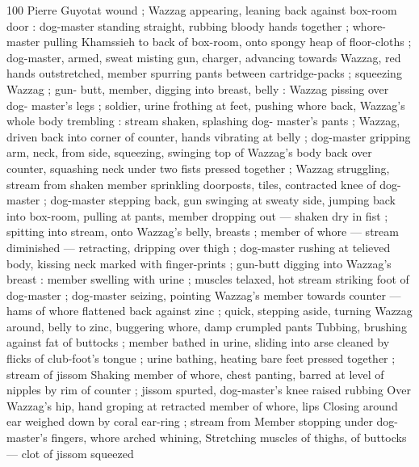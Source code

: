 100 Pierre Guyotat
wound ; Wazzag appearing, leaning back against box-room door :
dog-master standing straight, rubbing bloody hands together ;
whore-master pulling Khamssieh to back of box-room, onto spongy
heap of floor-cloths ; dog-master, armed, sweat misting gun, charger,
advancing towards Wazzag, red hands outstretched, member
spurring pants between cartridge-packs ; squeezing Wazzag ; gun-
butt, member, digging into breast, belly : Wazzag pissing over dog-
master's legs ; soldier, urine frothing at feet, pushing whore back,
Wazzag's whole body trembling : stream shaken, splashing dog-
master's pants ; Wazzag, driven back into corner of counter, hands
vibrating at belly ; dog-master gripping arm, neck, from side,
squeezing, swinging top of Wazzag's body back over counter,
squashing neck under two fists pressed together ; Wazzag
struggling, stream from shaken member sprinkling doorposts, tiles,
contracted knee of dog-master ; dog-master stepping back, gun
swinging at sweaty side, jumping back into box-room, pulling at
pants, member dropping out — shaken dry in fist ; spitting into
stream, onto Wazzag's belly, breasts ; member of whore — stream
diminished — retracting, dripping over thigh ; dog-master rushing at
telieved body, kissing neck marked with finger-prints ; gun-butt
digging into Wazzag's breast : member swelling with urine ; muscles
telaxed, hot stream striking foot of dog-master ; dog-master seizing,
pointing Wazzag's member towards counter — hams of whore
flattened back against zinc ; quick, stepping aside, turning Wazzag
around, belly to zinc, buggering whore, damp crumpled pants
Tubbing, brushing against fat of buttocks ; member bathed in urine,
sliding into arse cleaned by flicks of club-foot's tongue ; urine
bathing, heating bare feet pressed together ; stream of jissom
Shaking member of whore, chest panting, barred at level of nipples
by rim of counter ; jissom spurted, dog-master's knee raised rubbing
Over Wazzag's hip, hand groping at retracted member of whore, lips
Closing around ear weighed down by coral ear-ring ; stream from
Member stopping under dog-master's fingers, whore arched whining,
Stretching muscles of thighs, of buttocks — clot of jissom squeezed

